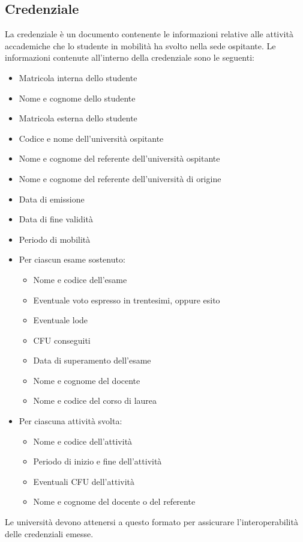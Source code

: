 \documentclass[a4paper,12pt]{article}
\begin{document}
\subsection{Credenziale}
La credenziale è un documento contenente le informazioni relative alle attività accademiche che lo studente in mobilità ha svolto nella sede ospitante. 
\newline Le informazioni contenute all'interno della credenziale sono le seguenti:
\begin{itemize}
    \item Matricola interna dello studente
    \item Nome e cognome dello studente
    \item Matricola esterna dello studente
    \item Codice e nome dell'università ospitante
    \item Nome e cognome del referente dell'università ospitante
    \item Nome e cognome del referente dell'università di origine
    \item Data di emissione  
    \item Data di fine validità
    \item Periodo di mobilità
    \item Per ciascun esame sostenuto:
    \begin{itemize}[label=$\circ$]
        \item Nome e codice dell'esame
        \item Eventuale voto espresso in trentesimi, oppure esito
        \item Eventuale lode
        \item CFU conseguiti
        \item Data di superamento dell'esame
        \item Nome e cognome del docente
        \item Nome e codice del corso di laurea
    \end{itemize}
    \item Per ciascuna attività svolta:
    \begin{itemize}[label=$\circ$]
        \item Nome e codice dell'attività
        \item Periodo di inizio e fine dell'attività
        \item Eventuali CFU dell'attività
        \item Nome e cognome del docente o del referente
    \end{itemize}
\end{itemize}
Le università devono attenersi a questo formato per assicurare l'interoperabilità delle credenziali emesse.
\end{document}
